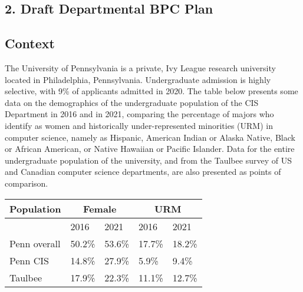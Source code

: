 


\subsection*{2. Draft Departmental BPC Plan}

\subsection*{Context}

The University of Pennsylvania is a private, Ivy League research university located in Philadelphia, Pennsylvania. Undergraduate admission is highly selective, with 9\% of applicants admitted in 2020. The table below presents some data on the demographics of the undergraduate population of the CIS Department in 2016 and in 2021, comparing the percentage of majors who identify as women and historically under-represented minorities (URM) in computer science, namely as Hispanic, American Indian or Alaska Native, Black or African American, or Native Hawaiian or Pacific Islander. Data for the entire undergraduate population of the university, and from the Taulbee survey of US and Canadian computer science departments, are also presented as points of comparison.

\begin{center}
\begin{tabular}{|l|l|l|l|l|}
\hline
  Population & \multicolumn{2}{|c|}{Female} & \multicolumn{2}{|c|}{URM}
\\
\hline
  & 2016 & 2021 & 2016 & 2021
\\
\hline
Penn overall &
50.2\% &
53.6\% &
17.7\% &
18.2\%
\\
Penn CIS &
14.8\% &
27.9\% &
5.9\% &
9.4\%
\\
Taulbee &
17.9\% &
22.3\% &
11.1\% &
12.7\% \\
\hline
\end{tabular}
\end{center}


